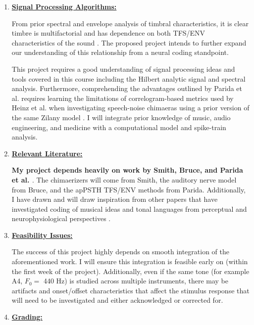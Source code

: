 \documentclass[9pt]{article}
\begin{document}
\begin{enumerate}
\item \textbf{\underline{Signal Processing Algorithms:}}

From prior spectral and envelope analysis of timbral characteristics, it is clear timbre is multifactorial and has dependence on both TFS/ENV characteristics of the sound \cite{lee_timbre_2020}. The proposed project intends to further expand our understanding of this relationship from a neural coding standpoint. 

This project requires a good understanding of signal processing ideas and tools covered in this course including the Hilbert analytic signal and spectral analysis. Furthermore, comprehending the advantages outlined by Parida et al. requires learning the limitations of correlogram-based metrics used by Heinz et al. when investigating speech-noise chimaeras using a prior version of the same Zilany model \cite{parida_spectrally_2020}. I will integrate prior knowledge of music, audio engineering, and medicine with a computational model and spike-train analysis.   

\item \textbf{\underline{Relevant Literature:}}

\textbf{My project depends heavily on work by Smith, Bruce, and Parida et al. \cite{smith_chimaeric_2002,bruce_phenomenological_2018,parida_spectrally_2020}}. The chimaerizers will come from Smith, the auditory nerve model from Bruce, and the apPSTH TFS/ENV  methods from Parida. Additionally, I have drawn and will draw inspiration from other papers that have investigated coding of musical ideas and tonal languages from perceptual and neurophysiological perspectives \cite{manno_uncertain_2019,arnoldner_speech_2007,xu_relative_2003,riquimaroux_perception_2006,li_improved_2012,bidelman_auditory-nerve_2011}.

\item \textbf{\underline{Feasibility Issues:}}

The success of this project highly depends on smooth integration of the aforementioned work. I will ensure this integration is feasible early on (within the first week of the project). Additionally, even if the same tone (for example A4, $F_{0} = $ 440 Hz) is studied across multiple instruments, there may be artifacts and onset/offset characteristics that affect the stimulus response that will need to be investigated and either acknowledged or corrected for. 

\item \textbf{\underline{Grading: }}


\end{enumerate}
\end{document}
